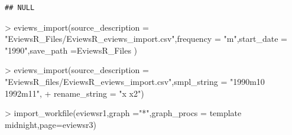\documentclass[
]{article}
\newenvironment{Shaded}{\begin{snugshade}}{\end{snugshade}}
\newcommand{\AttributeTok}[1]{\textcolor[rgb]{0.77,0.63,0.00}{#1}}
\newcommand{\FunctionTok}[1]{\textcolor[rgb]{0.00,0.00,0.00}{#1}}
\newcommand{\NormalTok}[1]{#1}
\newcommand{\SpecialCharTok}[1]{\textcolor[rgb]{0.00,0.00,0.00}{#1}}
\newcommand{\StringTok}[1]{\textcolor[rgb]{0.31,0.60,0.02}{#1}}
\begin{document}
\begin{verbatim}
## NULL
\end{verbatim}

\begin{Shaded}
\begin{Highlighting}[]
\SpecialCharTok{\textgreater{}} \FunctionTok{eviews\_import}\NormalTok{(}\AttributeTok{source\_description =} \StringTok{"EviewsR\_Files/EviewsR\_eviews\_import.csv"}\NormalTok{,}\AttributeTok{frequency =} \StringTok{"m"}\NormalTok{,}\AttributeTok{start\_date =} \StringTok{"1990"}\NormalTok{,}\AttributeTok{save\_path =}\StringTok{\textquotesingle{}EviewsR\_Files\textquotesingle{}}\NormalTok{ )}
\end{Highlighting}
\end{Shaded}

\begin{Shaded}
\begin{Highlighting}[]
\SpecialCharTok{\textgreater{}} \FunctionTok{eviews\_import}\NormalTok{(}\AttributeTok{source\_description =} \StringTok{"EviewsR\_files/EviewsR\_eviews\_import.csv"}\NormalTok{,}\AttributeTok{smpl\_string =} \StringTok{"1990m10 1992m11"}\NormalTok{,}
\SpecialCharTok{+} \AttributeTok{rename\_string =} \StringTok{"x x2"}\NormalTok{)}
\end{Highlighting}
\end{Shaded}

\begin{Shaded}
\begin{Highlighting}[]
\SpecialCharTok{\textgreater{}} \FunctionTok{import\_workfile}\NormalTok{(}\StringTok{\textquotesingle{}eviewsr1\textquotesingle{}}\NormalTok{,}\AttributeTok{graph =}\StringTok{"*"}\NormalTok{,}\AttributeTok{graph\_procs =} \StringTok{\textquotesingle{}template midnight\textquotesingle{}}\NormalTok{,}\AttributeTok{page=}\StringTok{\textquotesingle{}eviewsr3\textquotesingle{}}\NormalTok{)}
\end{Highlighting}
\end{Shaded}
\end{document}
